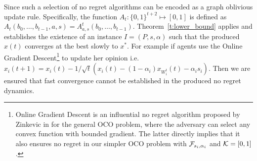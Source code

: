 Since such a selection of no regret algorithms can be encoded as a graph oblivious update rule.
Specifically, the function $A_t:\{0,1\}^{t+2} \mapsto [0,1]$ is defined
as $A_t(b_0,\ldots,b_{t-1},a,s) = A^t_{a,s}(b_0,\ldots,b_{t-1})$.
Theorem~\ref{t:lower_bound} applies and establishes the existence of an 
instance $I=(P,s,\alpha)$ such that the produced $x(t)$ converges at the best
slowly to $x^*$. For example if agents use the Online Gradient Descent\footnote{
Online Gradient Descent is an influential no regret algorithm 
proposed by Zinkevic in \cite{Z03} for the general OCO problem, where
the adversary can select any convex function with bounded gradient. The latter
directly implies that it also ensures no regret in our simpler 
OCO problem with $\mathcal{F}_{s_i,\alpha_i}$ and $\mathcal{K}=[0,1]$.}
to update her opinion i.e. $x_i(t+1)= x_i(t) - 1/\sqrt{t}(x_i(t)-(1-\alpha_i)x_{W_i^t}(t)-\alpha_is_i)$.
Then we are ensured that fast convergence cannot be established in the produced no regret dynamics.

